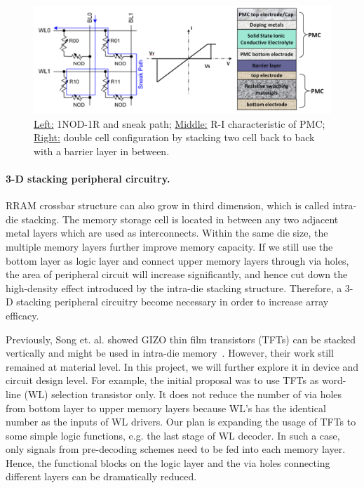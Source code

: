 \begin{figure}
\centering
\vspace{-10pt}
\includegraphics[width=0.75 \textwidth]{./figure/6_doublecell.pdf}
\vspace{-10pt}
\caption{\underline{Left:} 1NOD-1R and sneak path; \underline{Middle:} R-I characteristic of PMC; \underline{Right:} double cell configuration by stacking two cell back to back with a barrier layer in between.}
\label{doublecell}
\vspace{-10pt}
\end{figure}

\paragraph{3-D stacking peripheral circuitry.}
RRAM crossbar structure can also grow in third dimension, which is called intra-die stacking. The memory storage cell is located in between any two adjacent metal layers which are used as interconnects. Within the same die size, the multiple memory layers further improve memory capacity. If we still use the bottom layer as logic layer and connect upper memory layers through via holes, the area of  peripheral circuit will increase significantly, and hence cut down the high-density effect introduced by the intra-die stacking structure. Therefore, a 3-D stacking peripheral circuitry become necessary in order to increase array efficacy.

Previously, Song et. al. showed GIZO thin film transistors (TFTs) can be stacked vertically and might be used in intra-die memory~\cite{Song08}. However, their work still remained at material level. In this project, we will further explore it in device and circuit design level. For example, the initial proposal was to use TFTs as word-line (WL) selection transistor only. It does not reduce the number of via holes from bottom layer to upper memory layers because WL's has the identical number as the inputs of WL drivers. Our plan is expanding the usage of TFTs to some simple logic functions, e.g. the last stage of WL decoder. In such a case, only signals from pre-decoding schemes need to be fed into each memory layer. Hence, the functional blocks on the logic layer and the via holes connecting different layers can be dramatically reduced. 

